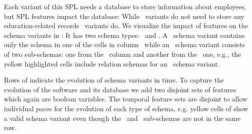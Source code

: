Each variant of this SPL needs a database to store information
about employees, but SPL features impact the database: While
\basic\ variants do not need to store any education-related records 
\educational\ variants do. 
We visualize the impact of features on the schema variants in :
It has two
schema types: \basic\ and \educational.
A \basic\ schema variant contains only the schema in one of the cells in column \basic\
while an \educational\ schema variant consists of two sub-schemas: one from the \basic\
column and another from the \educational\ one, e.g., 
the yellow highlighted cells include relation schemas for an \educational\ schema variant. 

%
Rows of  indicate the evolution of schema variants in time.
To capture the evolution of the software and its database we add 
two disjoint sets of features which again are boolean variables.
The temporal feature sets are disjoint to allow 
individual paces for the evolution of each type of schema, e.g.
yellow cells of \tabref{mot} show a valid schema variant even though
the \basic\ and \educational\ sub-schemas are not in the same row. 
%

